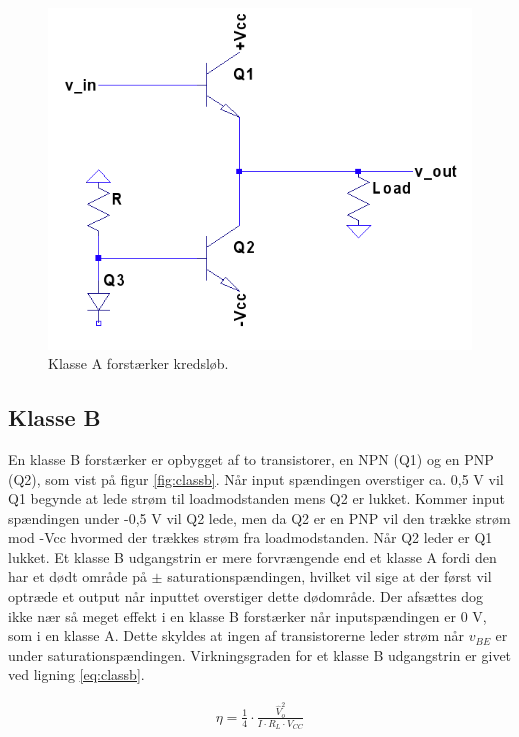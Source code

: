 \begin{figure}[h]
\centering
\includegraphics[scale=.35]{indledende_analyse/klasser/classa.png}
\caption{Klasse A forstærker kredsløb.}
\label{fig:classa}
\end{figure}


\subsection{Klasse B}
En klasse B forstærker er opbygget af to transistorer, en NPN (Q1) og en PNP (Q2), som vist på figur \ref{fig:classb}. Når input spændingen overstiger ca. 0,5 V vil Q1 begynde at lede strøm til loadmodstanden mens Q2 er lukket. Kommer input spændingen under -0,5 V vil Q2 lede, men da Q2 er en PNP vil den trække strøm mod -Vcc hvormed der trækkes strøm fra loadmodstanden. Når Q2 leder er Q1 lukket. 
Et klasse B udgangstrin er mere forvrængende end et klasse A fordi den har et dødt område på  $\pm$ saturationspændingen, hvilket vil sige at der først vil optræde et output når inputtet overstiger dette dødområde.  Der afsættes dog ikke nær så meget effekt i en klasse B forstærker når inputspændingen er 0 V, som i en klasse A. Dette skyldes at ingen af transistorerne leder strøm når $v_{BE} $ er under saturationspændingen. Virkningsgraden for et klasse B udgangstrin er givet ved ligning \ref{eq:classb}.

\begin{eqnarray}
\eta=\frac{1}{4} \cdot \frac{\widehat{V}_o^2}{I \cdot R_L \cdot V_{CC}}  \label{eq:classa}
\end{eqnarray}

